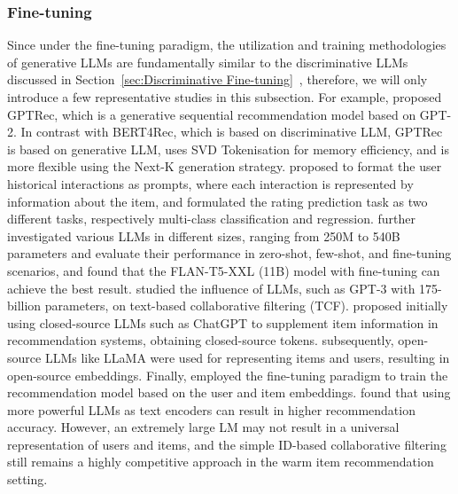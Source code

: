 \documentclass[sn-mathphys-num]{sn-jnl}%
\theoremstyle{thmstyleone}%
\theoremstyle{thmstyletwo}%
\theoremstyle{thmstylethree}%
\begin{document}
\subsubsection{Fine-tuning}
Since under the fine-tuning paradigm, the utilization and training methodologies of generative LLMs are fundamentally similar to the discriminative LLMs discussed in Section~\ref{sec:Discriminative Fine-tuning}~\cite{zhang2024notellm}, therefore, we will only introduce a few representative studies in this subsection. For example, \cite{petrov2023generative} proposed GPTRec, which is a generative sequential recommendation model based on GPT-2. In contrast with BERT4Rec, which is based on discriminative LLM, GPTRec is based on generative LLM, uses SVD Tokenisation for memory efficiency, and is more flexible using the Next-K generation strategy. \cite{DBLP:journals/corr/abs-2305-06474} proposed to format the user historical interactions as prompts, where each interaction is represented by information about the item, and formulated the rating prediction task as two different tasks, respectively multi-class classification and regression. \cite{DBLP:journals/corr/abs-2305-06474} further investigated various LLMs in different sizes, ranging from 250M to 540B parameters and
evaluate their performance in zero-shot, few-shot, and fine-tuning scenarios, and found that the FLAN-T5-XXL (11B) model with fine-tuning can achieve the best result. 
\cite{li2023exploring} studied the influence of LLMs, such as GPT-3 with 175-billion parameters, on text-based collaborative filtering (TCF). \cite{DBLP:journals/corr/abs-2305-06566} proposed initially using closed-source LLMs such as ChatGPT to supplement item information in recommendation systems, obtaining closed-source tokens. subsequently, open-source LLMs like LLaMA were used for representing items and users, resulting in open-source embeddings. Finally, \cite{DBLP:journals/corr/abs-2305-06566} employed the fine-tuning paradigm to train the recommendation model based on the user and item embeddings. \cite{li2023exploring} found that using more powerful LLMs as text encoders can result in higher recommendation accuracy. However, an extremely
large LM may not result in a universal representation of users and items, and the simple ID-based collaborative filtering still remains a highly competitive approach in the warm item recommendation setting.
\end{document}
